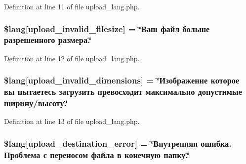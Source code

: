 Definition at line 11 of file upload\+\_\+lang.\+php.

\subsubsection[{\texorpdfstring{\$lang}{$lang}}]{\setlength{\rightskip}{0pt plus 5cm}\$lang\mbox{[}\textquotesingle{}upload\+\_\+invalid\+\_\+filesize\textquotesingle{}\mbox{]} = \char`\"{}Ваш файл больше разрешенного размера.\char`\"{}}\hypertarget{application_2language_2russian_2upload__lang_8php_a832b3ec1d84b1d48a488cf525954d8f2}{}\label{application_2language_2russian_2upload__lang_8php_a832b3ec1d84b1d48a488cf525954d8f2}


Definition at line 12 of file upload\+\_\+lang.\+php.

\subsubsection[{\texorpdfstring{\$lang}{$lang}}]{\setlength{\rightskip}{0pt plus 5cm}\$lang\mbox{[}\textquotesingle{}upload\+\_\+invalid\+\_\+dimensions\textquotesingle{}\mbox{]} = \char`\"{}Изображение которое вы пытаетесь загрузить превосходит максимально допустимые ширину/высоту.\char`\"{}}\hypertarget{application_2language_2russian_2upload__lang_8php_a4e796eeccf7df90acffea7884a5bd558}{}\label{application_2language_2russian_2upload__lang_8php_a4e796eeccf7df90acffea7884a5bd558}


Definition at line 13 of file upload\+\_\+lang.\+php.

\subsubsection[{\texorpdfstring{\$lang}{$lang}}]{\setlength{\rightskip}{0pt plus 5cm}\$lang\mbox{[}\textquotesingle{}upload\+\_\+destination\+\_\+error\textquotesingle{}\mbox{]} = \char`\"{}Внутренняя ошибка. Проблема с переносом файла в конечную папку.\char`\"{}}\hypertarget{application_2language_2russian_2upload__lang_8php_a31be70c748b9bfc43dd7468e1fa64c42}{}\label{application_2language_2russian_2upload__lang_8php_a31be70c748b9bfc43dd7468e1fa64c42}


